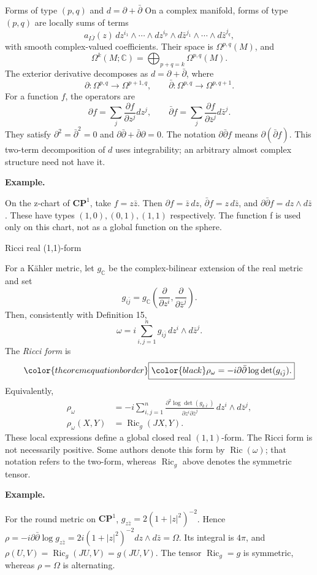 \documentclass[11pt]{article}
\makeatletter
\newcommand{\C}{\mathbb C}
\newcommand{\Ric}{\operatorname{Ric}}
\newcommand{\ddbar}{\partial\bar\partial}
\newcommand{\theoremboxed}[1]{%
  {\color{theoremequationborder}\boxed{\color{black}#1}}%
}
\newcounter{definition}
\newcommand{\CP}{\mathbf{CP}}
\newcommand{\exampleheading}{\par\medskip\textbf{Example.}\par\smallskip}
\newcommand{\currentdefinition}[1]{\protected@edef\@currentlabel{#1}}
\makeatother
\begin{document}
\begin{definitionbox}{Forms of type $(p,q)$ and $d=\partial+\bar\partial$}
\currentdefinition{\thedefinition}
\label{source:S23}
\label{def:B06}
On a complex manifold, forms of type $(p,q)$ are locally sums of terms
\[
a_{I\bar J}(z)\,dz^{i_1}\wedge\cdots\wedge dz^{i_p}
\wedge d\bar z^{j_1}\wedge\cdots\wedge d\bar z^{j_q},
\]
with smooth complex-valued coefficients. Their space is
$\Omega^{p,q}(M)$, and
\[
\Omega^k(M;\C)=\bigoplus_{p+q=k}\Omega^{p,q}(M).
\]
The exterior derivative decomposes as $d=\partial+\bar\partial$, where
\[
\partial:\Omega^{p,q}\to\Omega^{p+1,q},\qquad
\bar\partial:\Omega^{p,q}\to\Omega^{p,q+1}.
\]
For a function $f$, the operators are
\[
\partial f=\sum_j\frac{\partial f}{\partial z^j}dz^j,
\qquad \bar\partial f=\sum_j\frac{\partial f}{\partial\bar z^j}d\bar z^j.
\]
They satisfy $\partial^2=\bar\partial^2=0$ and
$\partial\bar\partial+\bar\partial\partial=0$.
The notation $\partial\bar\partial f$ means $\partial(\bar\partial f)$.
This two-term decomposition of $d$ uses integrability; an arbitrary
almost complex structure need not have it.


\exampleheading
On the z-chart of $\CP^1$, take $f=z\bar z$. Then $\partial f=\bar z\,dz$, $\bar\partial f=z\,d\bar z$, and $\partial\bar\partial f=dz\wedge d\bar z$. These have types $(1,0),(0,1),(1,1)$ respectively. The function f is used only on this chart, not as a global function on the sphere.
\end{definitionbox}

\begin{definitionbox}{Ricci real (1,1)-form}
\currentdefinition{\thedefinition}
\label{source:S24}

For a K\"ahler metric, let $g_{\C}$ be the complex-bilinear extension of
the real metric and set
\[
g_{i\bar j}=g_{\C}\left(\frac{\partial}{\partial z^i},
\frac{\partial}{\partial\bar z^j}\right).
\]
Then, consistently with Definition 15,
\[
\omega=i\sum_{i,j=1}^{n}g_{i\bar j}\,dz^i\wedge d\bar z^j.
\]
The \emph{Ricci form} is
\[
\theoremboxed{\rho_\omega=-i\ddbar\log\det(g_{i\bar j}).}
\]
Equivalently,
\begin{align*}
\rho_\omega&=-i\sum_{i,j=1}^{n}
\frac{\partial^2\log\det(g_{k\bar\ell})}{\partial z^i\partial\bar z^j}
\,dz^i\wedge d\bar z^j,\\[4pt]
\rho_\omega(X,Y)&=\Ric_g(JX,Y).
\end{align*}
These local expressions define a global closed real $(1,1)$-form.
The Ricci form is not necessarily positive.
Some authors denote this form by $\Ric(\omega)$; that notation refers
to the two-form, whereas $\Ric_g$ above denotes the symmetric tensor.


\exampleheading
For the round metric on $\CP^1$, $g_{z\bar z}=2(1+|z|^2)^{-2}$. Hence $\rho=-i\partial\bar\partial\log g_{z\bar z}=2i(1+|z|^2)^{-2}dz\wedge d\bar z=\Omega$. Its integral is $4\pi$, and $\rho(U,V)=\Ric_g(JU,V)=g(JU,V)$. The tensor $\Ric_g=g$ is symmetric, whereas $\rho=\Omega$ is alternating.
\end{definitionbox}
\end{document}
